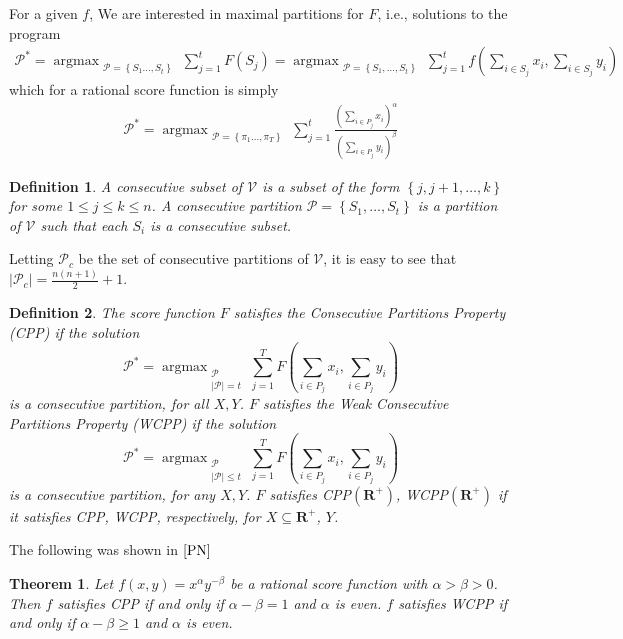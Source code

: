 \documentclass{article}
\newtheorem{thm}{Theorem}
\newtheorem{definition}{Definition}
\theoremstyle{case}
\DeclareMathOperator*{\argmax}{argmax} %
\begin{document}
For a given $f$, We are interested in maximal partitions for $F$, i.e., solutions to the program
\begin{align} \label{SetFMax}
\mathcal{P}^{*} = \argmax_{\substack{\mathcal{P} = \left\lbrace S_1 \dots, S_t\right\rbrace}} {\sum\limits_{j=1}^{t}F\left(S_j\right)} = \argmax_{\substack{\mathcal{P} = \left\lbrace S_1, \dots, S_t\right\rbrace}} {\sum\limits_{j=1}^{t}f( \sum_{i \in S_j}x_i, \sum_{i \in S_j}y_i)}
\end{align}
which for a rational score function is simply
\begin{align} \label{ScoreMax}
\mathcal{P}^{*} = \argmax_{\substack{\mathcal{P} = \left\lbrace \pi_1 \dots, \pi_T\right\rbrace}}\sum_{j=1}^{t}\frac{(\sum_{i \in P_j}x_i)^\alpha}{(\sum_{i \in P_j}y_i)^\beta}
\end{align}

\begin{definition}
A consecutive subset of $\mathcal{V}$ is a subset of the form $\left\lbrace j, j+1, \dots, k \right\rbrace$ for some $1 \leq j \leq k \leq n$. A consecutive partition $\mathcal{P} = \left\lbrace S_1, \dots, S_t\right\rbrace$ is a partition of $\mathcal{V}$ such that each $S_i$ is a consecutive subset. 
\end{definition}
Letting $\mathcal{P}_{c}$ be the set of consecutive partitions of $\mathcal{V}$, it is easy to see that  $| \mathcal{P}_c | = \frac{n(n+1)}{2} + 1$.
\begin{definition}
The score function $F$ satisfies the Consecutive Partitions Property (CPP) if the solution
\[
\mathcal{P}^* = \argmax_{\substack{\mathcal{P} \\ \vert \mathcal{P}\vert = t}} {\sum\limits_{j=1}^{T}F( \sum_{i \in P_j}x_i, \sum_{i \in P_j}y_i)}
\]
is a consecutive partition, for all $X, Y$. $F$ satisfies the Weak Consecutive Partitions Property (WCPP) if the solution
\[
\mathcal{P}^* = \argmax_{\substack{\mathcal{P} \\ \vert \mathcal{P}\vert \leq t}} {\sum\limits_{j=1}^{T}F( \sum_{i \in P_j}x_i, \sum_{i \in P_j}y_i)}
\]
is a consecutive partition, for any $X, Y$. $F$ satisfies CPP$(\mathbf{R}^+)$, WCPP$(\mathbf{R}^+)$ if it satisfies CPP, WCPP, respectively, for $X \subseteq \mathbf{R}^+$, $Y$.
\end{definition}

The following was shown in $\cite{PN}$

\begin{thm} \label{thm1}
Let $f(x,y) = x^{\alpha}y^{-\beta}$ be a rational score function with $\alpha > \beta > 0$. Then $f$ satisfies CPP if and only if $\alpha - \beta = 1$ and $\alpha$ is even. $f$ satisfies WCPP if and only if $\alpha - \beta \geq 1$ and $\alpha$ is even. 
\end{thm}
\end{document}
